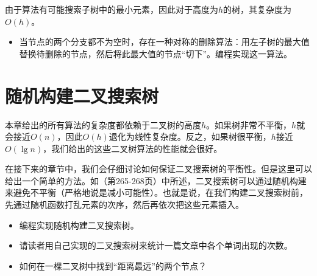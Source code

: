\documentclass{ctexart}
\begin{document}
由于算法有可能搜索子树中的最小元素，因此对于高度为$h$的树，其复杂度为$O(h)$。

\begin{Exercise}

\begin{itemize}
\item 当节点的两个分支都不为空时，存在一种对称的删除算法：用左子树的最大值替换待删除的节点，然后将此最大值的节点“切下”。编程实现这一算法。
\end{itemize}

\end{Exercise}

\section{随机构建二叉搜索树}

本章给出的所有算法的复杂度都依赖于二叉树的高度$h$。如果树非常不平衡，$h$就会接近$O(n)$，因此$O(h)$退化为线性复杂度。反之，如果树很平衡，$h$接近$O(\lg n)$，我们给出的这些二叉树算法的性能就会很好。

在接下来的章节中，我们会仔细讨论如何保证二叉搜索树的平衡性。但是这里可以给出一个简单的方法。如\cite{CLRS}（第265-268页）中所述，二叉搜索树可以通过随机构建来避免不平衡（严格地说是减小可能性）。也就是说，在我们构建二叉搜索树前，先通过随机函数打乱元素的次序，然后再依次把这些元素插入。

\begin{Exercise}

\begin{itemize}
\item 编程实现随机构建二叉搜索树。
\item 请读者用自己实现的二叉搜索树来统计一篇文章中各个单词出现的次数。
\item 如何在一棵二叉树中找到“距离最远”的两个节点？
\end{itemize}

\end{Exercise}
\end{document}

